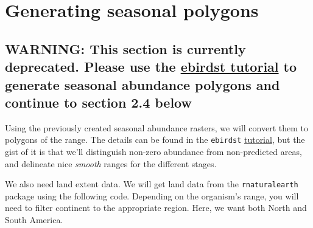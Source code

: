 \documentclass[
]{book}
\begin{document}
\hypertarget{generating-seasonal-polygons}{%
\section{Generating seasonal polygons}\label{generating-seasonal-polygons}}

\hypertarget{warning-this-section-is-currently-deprecated.-please-use-the-ebirdst-tutorial-to-generate-seasonal-abundance-polygons-and-continue-to-section-2.4-below-1}{%
\subsection{\texorpdfstring{WARNING: This section is currently deprecated. Please use the \href{https://cornelllabofornithology.github.io/ebirdst/articles/ebirdst-advanced-mapping.html}{ebirdst tutorial} to generate seasonal abundance polygons and continue to section 2.4 below}{WARNING: This section is currently deprecated. Please use the ebirdst tutorial to generate seasonal abundance polygons and continue to section 2.4 below}}\label{warning-this-section-is-currently-deprecated.-please-use-the-ebirdst-tutorial-to-generate-seasonal-abundance-polygons-and-continue-to-section-2.4-below-1}}

Using the previously created seasonal abundance rasters, we will convert them to polygons of the range. The details can be found in the \texttt{ebirdst} \href{https://cornelllabofornithology.github.io/ebirdst/articles/ebirdst-advanced-mapping.html}{tutorial}, but the gist of it is that we'll distinguish non-zero abundance from non-predicted areas, and delineate nice \emph{smooth} ranges for the different stages.

We also need land extent data. We will get land data from the \texttt{rnaturalearth} package using the following code. Depending on the organism's range, you will need to filter continent to the appropriate region. Here, we want both North and South America.
\end{document}
